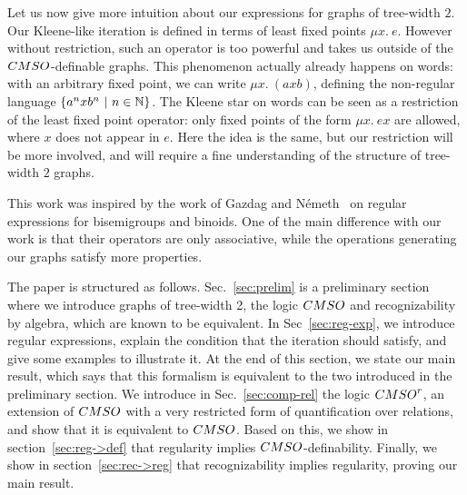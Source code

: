 Let us now give more intuition about our expressions for graphs of
tree-width $2$. Our Kleene-like iteration is defined in terms of least
fixed points $\mu x.\ e$.
However without restriction, such an operator is too powerful and takes
us outside of the $\CMSO$-definable graphs. This phenomenon actually already
happens on words: with an arbitrary fixed point, we can write $\mu x.\ (axb)$,
defining the non-regular language $\left\{a^nxb^n\ |\ n\in\mathbb{N}\right\}$. The Kleene star on
words can be seen as a restriction of the least fixed point operator: only
fixed points of the form $\mu x.\ ex$ are allowed, where $x$ does not appear in $e$.
Here the idea is the same, but our restriction will be more involved,
and will require a fine understanding of the structure of tree-width $2$
graphs.
\smallskip


This work was inspired by the work of Gazdag and Németh~\cite{Gazdag} on regular expressions for bisemigroups and  binoids.   One of the main difference with our work is that their operators are only associative, while the operations generating our graphs satisfy more properties. 

\smallskip
The paper is structured as follows. Sec.~\ref{sec:prelim} is a preliminary section where we introduce graphs of tree-width 2, the logic $\CMSO$ and recognizability by algebra, which are known to be equivalent. In Sec~\ref{sec:reg-exp}, we introduce regular expressions, explain the condition that the iteration should satisfy, and give  some examples  to illustrate it. At the end of this section, we state our main result, which says that this formalism is equivalent to the two introduced in the preliminary section. We introduce in Sec.~\ref{sec:comp-rel} the logic $\CMSO^r$, an extension of $\CMSO$ with a very restricted form of quantification over relations, and show that it is equivalent to $\CMSO$. Based on this, we show in section~\ref{sec:reg->def} that regularity implies $\CMSO$-definability. Finally, we show in section~\ref{sec:rec->reg} that recognizability implies regularity, proving our main result. 
%
